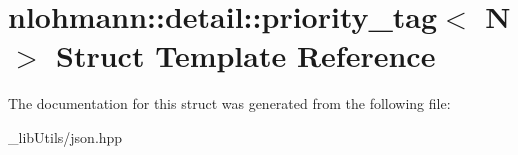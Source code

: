 \hypertarget{structnlohmann_1_1detail_1_1priority__tag}{}\section{nlohmann\+:\+:detail\+:\+:priority\+\_\+tag$<$ N $>$ Struct Template Reference}
\label{structnlohmann_1_1detail_1_1priority__tag}


The documentation for this struct was generated from the following file\+:\begin{DoxyCompactItemize}
\item 
\+\_\+lib\+Utils/json.\+hpp\end{DoxyCompactItemize}
